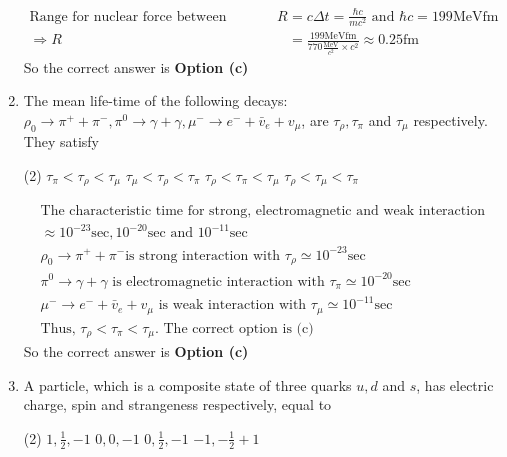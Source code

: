 \begin{enumerate}
\begin{answer}
\begin{align*}
		\text{Range for nuclear force between nucleon will be }R&=c \Delta t=\frac{\hbar c}{m c^2}\text{ and }\hbar c=199 \mathrm{MeVfm}\\
		\Rightarrow R&=\frac{199 \mathrm{MeVfm}}{770 \frac{\mathrm{MeV}}{c^2} \times c^2} \approx 0.25 \mathrm{fm}
		\end{align*}
		So the correct answer is \textbf{Option (c)}
	\end{answer}
	\item  The mean life-time of the following decays: $\rho_0 \rightarrow \pi^{+}+\pi^{-}, \pi^0 \rightarrow \gamma+\gamma, \mu^{-} \rightarrow e^{-}+\bar{v}_e+v_\mu$, are $\tau_\rho, \tau_\pi$ and $\tau_\mu$ respectively.
	They satisfy
	{}
	\begin{tasks}(2)
		\task[\textbf{a.}]$\tau_\pi<\tau_\rho<\tau_\mu$
		\task[\textbf{b.}]$\tau_\mu<\tau_\rho<\tau_\pi$
		\task[\textbf{c.}]$\tau_\rho<\tau_\pi<\tau_\mu$
		\task[\textbf{d.}] $\tau_\rho<\tau_\mu<\tau_\pi$
	\end{tasks}
	\begin{answer}
		\begin{align*}
		&\text{The characteristic time for strong, electromagnetic and weak interaction are} \\
		&\text{$\approx 10^{-23} \mathrm{sec}, 10^{-20} \mathrm{sec}$ and $10^{-11} \mathrm{sec}$}\\
		&\text{$\rho_0 \rightarrow \pi^{+}+\pi^{-}$is strong interaction with $\tau_\rho \simeq 10^{-23} \mathrm{sec}$}\\
		&\text{$\pi^0 \rightarrow \gamma+\gamma$ is electromagnetic interaction with $\tau_\pi \simeq 10^{-20} \mathrm{sec}$}\\
		&\text{$\mu^{-} \rightarrow e^{-}+\bar{v}_e+v_\mu$ is weak interaction with $\tau_\mu \simeq 10^{-11} \mathrm{sec}$}\\
		&\text{Thus, $\tau_\rho<\tau_\pi<\tau_\mu$. The correct option is (c)}
		\end{align*}
		So the correct answer is \textbf{Option (c)}
	\end{answer}
	\item  A particle, which is a composite state of three quarks $u, d$ and $s$, has electric charge, spin and strangeness respectively, equal to
	{}
	\begin{tasks}(2)
		\task[\textbf{a.}]$1, \frac{1}{2},-1$
		\task[\textbf{b.}]$0,0,-1$
		\task[\textbf{c.}]$0, \frac{1}{2},-1$
		\task[\textbf{d.}] $-1,-\frac{1}{2}+1$
	\end{tasks}

\end{enumerate}
